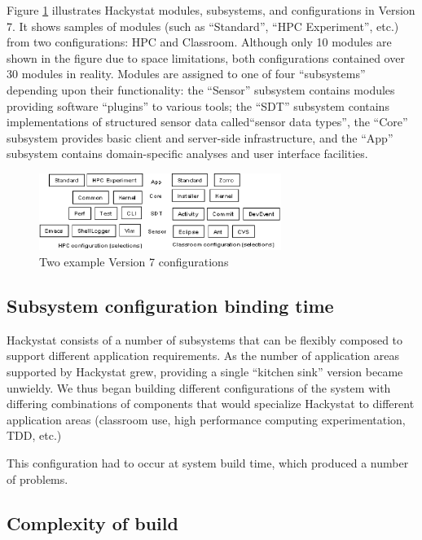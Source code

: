 \documentclass[conference,compsoc,peerreview]{IEEEtran}
\begin{document}
Figure \ref{fig:configurations} illustrates Hackystat modules, subsystems,
and configurations in Version 7.  It shows samples of modules (such as
``Standard'', ``HPC Experiment'', etc.) from two configurations: HPC and
Classroom.  Although only 10 modules are shown in the figure due to space
limitations, both configurations contained over 30 modules in reality.
Modules are assigned to one of four ``subsystems'' depending upon their
functionality: the ``Sensor'' subsystem contains modules providing software
``plugins'' to various tools; the ``SDT'' subsystem contains
implementations of structured sensor data called``sensor data types'', the
``Core'' subsystem provides basic client and server-side infrastructure,
and the ``App'' subsystem contains domain-specific analyses and user
interface facilities.

\begin{figure}[ht]
  \center
  \includegraphics[width=0.7\textwidth]{configurations5.eps}
  \caption{Two example Version 7 configurations}
  \label{fig:configurations}
\end{figure} 


\subsection{Subsystem configuration binding time}

Hackystat consists of a number of subsystems that can be flexibly composed to support different application requirements.  As the number of application areas supported by Hackystat grew, providing a single ``kitchen sink'' version became unwieldy.  We thus began building different configurations of the system with differing combinations of components that would specialize Hackystat to different application areas (classroom use, high performance computing experimentation, TDD, etc.) 

This configuration had to occur at system build time, which produced a number of problems.

\subsection{Complexity of build}
\end{document}

